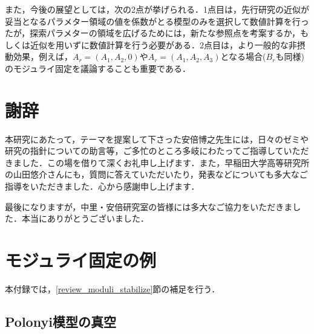 \documentclass[a4paper,uplatex,dvipdfmx]{jsarticle}
\theoremstyle{definition}
\renewcommand{\theequation}{\thesection.\arabic{equation}}
\renewcommand{\thefigure}{\thesection.\arabic{figure}}
\renewcommand{\thetable}{\thesection.\arabic{table}}
\begin{document}
また，今後の展望としては，次の2点が挙げられる．1点目は，先行研究の近似が妥当となるパラメター領域の値を係数がとる模型のみを選択して数値計算を行ったが，探索パラメターの領域を広げるためには，新たな参照点を考案するか，もしくは近似を用いずに数値計算を行う必要がある．2点目は，より一般的な非摂動効果，例えば，$A_{r}=(A_{1},A_{2},0)$や$A_{r}=(A_{1},A_{2},A_{3})$となる場合($B_{r}$も同様)のモジュライ固定を議論することも重要である．


\section*{謝辞}

本研究にあたって，テーマを提案して下さった安倍博之先生には，日々のゼミや研究の指針についての助言等，ご多忙のところ多岐にわたってご指導していただきました．この場を借りて深くお礼申し上げます．また，早稲田大学高等研究所の山田悠介さんにも，質問に答えていただいたり，発表などについても多大なご指導をいただきました．心から感謝申し上げます．

最後になりますが，中里・安倍研究室の皆様には多大なご協力をいただきました．本当にありがとうございました．


\makeatletter
\renewcommand{\appendix}{\par
  \setcounter{section}{0}%
  \setcounter{subsection}{0}%
  \gdef\presectionname{\appendixname}%
  \gdef\postsectionname{}%
  \gdef\thesection{\presectionname\@Alph\c@section\postsectionname}%
  \gdef\thesubsection{\@Alph\c@section.\@arabic\c@subsection}%
  \renewcommand{\theequation}{\@Alph\c@section.\arabic{equation}}%
  \renewcommand{\thefigure}{\@Alph\c@section.\arabic{figure}}%
  \renewcommand{\thetable}{\@Alph\c@section.\arabic{table}}%
}
\makeatother
\appendix


\section{モジュライ固定の例}
\label{moduli_stabili_eg}

本付録では，\ref{review_moduli_stabilize}節の補足を行う．

\subsection{Polonyi模型の真空}
\label{polonyi_reference}
\end{document}
